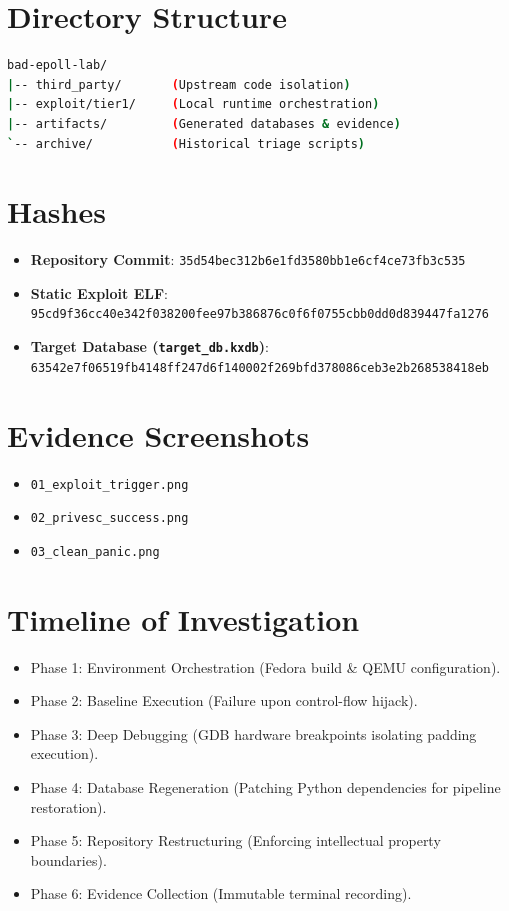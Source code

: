 \documentclass[11pt,a4paper]{article}
\begin{document}
\section{Directory Structure}
\begin{lstlisting}[language=bash]
bad-epoll-lab/
|-- third_party/       (Upstream code isolation)
|-- exploit/tier1/     (Local runtime orchestration)
|-- artifacts/         (Generated databases & evidence)
`-- archive/           (Historical triage scripts)
\end{lstlisting}

\section{Hashes}
\begin{itemize}
    \item \textbf{Repository Commit}: \texttt{35d54bec312b6e1fd3580bb1e6cf4ce73fb3c535}
    \item \textbf{Static Exploit ELF}: \texttt{95cd9f36cc40e342f038200fee97b386876c0f6f0755cbb0dd0d839447fa1276}
    \item \textbf{Target Database (\texttt{target\_db.kxdb})}: \texttt{63542e7f06519fb4148ff247d6f140002f269bfd378086ceb3e2b268538418eb}
\end{itemize}

\section{Evidence Screenshots}
\begin{itemize}
    \item \texttt{01\_exploit\_trigger.png}
    \item \texttt{02\_privesc\_success.png}
    \item \texttt{03\_clean\_panic.png}
\end{itemize}

\section{Timeline of Investigation}
\begin{itemize}
    \item Phase 1: Environment Orchestration (Fedora build \& QEMU configuration).
    \item Phase 2: Baseline Execution (Failure upon control-flow hijack).
    \item Phase 3: Deep Debugging (GDB hardware breakpoints isolating padding execution).
    \item Phase 4: Database Regeneration (Patching Python dependencies for pipeline restoration).
    \item Phase 5: Repository Restructuring (Enforcing intellectual property boundaries).
    \item Phase 6: Evidence Collection (Immutable terminal recording).
\end{itemize}
\end{document}
